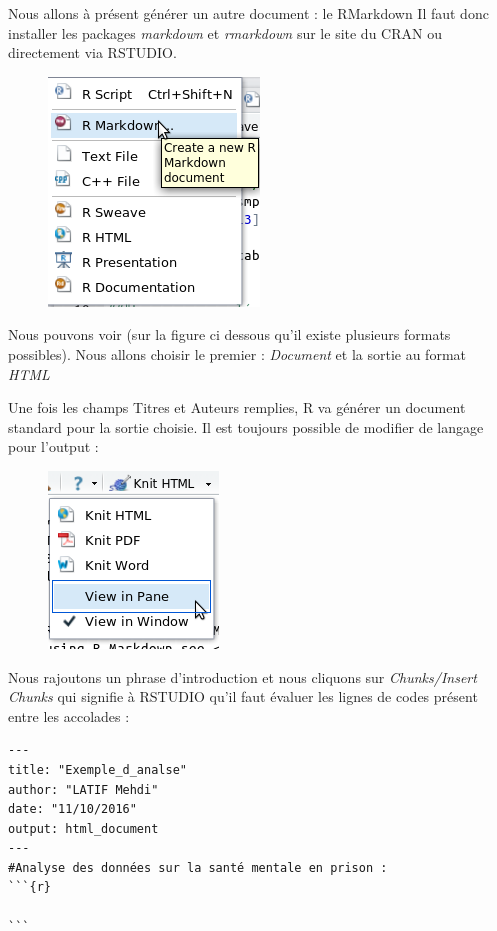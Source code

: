 Nous allons à présent générer un autre document : le RMarkdown\newline
Il faut donc installer les packages \textit{markdown} et \textit{rmarkdown} sur le site du CRAN ou directement via RSTUDIO.\newline

\begin{figure}[H]\begin{center}\includegraphics[scale=0.5]{ilu/bz.png}\end{center}\end{figure}

Nous pouvons voir (sur la figure ci dessous qu'il existe plusieurs formats possibles). Nous allons choisir le premier : \textit{Document} et la sortie au format \textit{HTML}

Une fois les champs Titres et Auteurs remplies, R va générer un document standard pour la sortie choisie.\newline
Il est toujours possible de modifier de langage pour l'output : 

\begin{figure}[H]\begin{center}\includegraphics[scale=0.5]{ilu/cb.png}\end{center}\end{figure} 

Nous rajoutons un phrase d'introduction et nous cliquons sur \textit{Chunks/Insert Chunks} qui signifie à RSTUDIO qu'il faut évaluer les lignes de codes présent entre les accolades : 
\begin{lstlisting}[language=html]
---
title: "Exemple_d_analse"
author: "LATIF Mehdi"
date: "11/10/2016"
output: html_document
---
#Analyse des données sur la santé mentale en prison : 
```{r}

```
\end{lstlisting}


